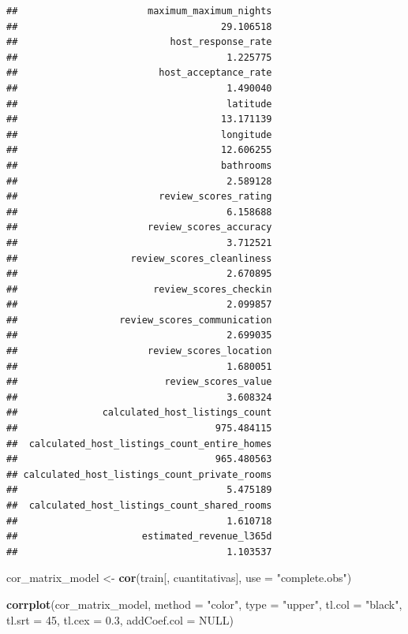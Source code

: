 \documentclass[
]{article}
\newenvironment{Shaded}{\begin{snugshade}}{\end{snugshade}}
\newcommand{\AttributeTok}[1]{\textcolor[rgb]{0.13,0.29,0.53}{#1}}
\newcommand{\ConstantTok}[1]{\textcolor[rgb]{0.56,0.35,0.01}{#1}}
\newcommand{\DecValTok}[1]{\textcolor[rgb]{0.00,0.00,0.81}{#1}}
\newcommand{\FloatTok}[1]{\textcolor[rgb]{0.00,0.00,0.81}{#1}}
\newcommand{\FunctionTok}[1]{\textcolor[rgb]{0.13,0.29,0.53}{\textbf{#1}}}
\newcommand{\NormalTok}[1]{#1}
\newcommand{\OtherTok}[1]{\textcolor[rgb]{0.56,0.35,0.01}{#1}}
\newcommand{\StringTok}[1]{\textcolor[rgb]{0.31,0.60,0.02}{#1}}
\begin{document}
\begin{verbatim}
##                       maximum_maximum_nights 
##                                    29.106518 
##                           host_response_rate 
##                                     1.225775 
##                         host_acceptance_rate 
##                                     1.490040 
##                                     latitude 
##                                    13.171139 
##                                    longitude 
##                                    12.606255 
##                                    bathrooms 
##                                     2.589128 
##                         review_scores_rating 
##                                     6.158688 
##                       review_scores_accuracy 
##                                     3.712521 
##                    review_scores_cleanliness 
##                                     2.670895 
##                        review_scores_checkin 
##                                     2.099857 
##                  review_scores_communication 
##                                     2.699035 
##                       review_scores_location 
##                                     1.680051 
##                          review_scores_value 
##                                     3.608324 
##               calculated_host_listings_count 
##                                   975.484115 
##  calculated_host_listings_count_entire_homes 
##                                   965.480563 
## calculated_host_listings_count_private_rooms 
##                                     5.475189 
##  calculated_host_listings_count_shared_rooms 
##                                     1.610718 
##                      estimated_revenue_l365d 
##                                     1.103537
\end{verbatim}

\begin{Shaded}
\begin{Highlighting}[]
\NormalTok{cor\_matrix\_model }\OtherTok{\textless{}{-}} \FunctionTok{cor}\NormalTok{(train[, cuantitativas], }\AttributeTok{use =} \StringTok{"complete.obs"}\NormalTok{)}


\FunctionTok{corrplot}\NormalTok{(cor\_matrix\_model,}
         \AttributeTok{method =} \StringTok{"color"}\NormalTok{,}
         \AttributeTok{type =} \StringTok{"upper"}\NormalTok{,}
         \AttributeTok{tl.col =} \StringTok{"black"}\NormalTok{,}
         \AttributeTok{tl.srt =} \DecValTok{45}\NormalTok{,}
         \AttributeTok{tl.cex =} \FloatTok{0.3}\NormalTok{,}
         \AttributeTok{addCoef.col =} \ConstantTok{NULL}\NormalTok{)}
\end{Highlighting}
\end{Shaded}
\end{document}
